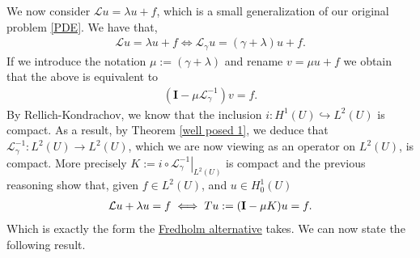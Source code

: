 \documentclass[
    a4paper,
    DIV=14,
    abstract=true,
    numbers=noenddot
]
{scrartcl}
\theoremstyle{definition}
\newcommand\restr[2]{\left.#1\right|_{#2}}
\newcommand{\Ll}{\mathcal{L}}
\begin{document}
We now consider $\Ll u =\lambda u+f$, which is a small generalization of our original problem \eqref{PDE}. We have that,
\begin{align*}
	\Ll u = \lambda u + f \iff  \Ll_\gamma u =(\gamma+\lambda)u +f.
\end{align*}
If we introduce the notation $\mu:=(\gamma+\lambda)$ and rename $v=\mu u +f$ we obtain that the above is equivalent to
\begin{align*}
	(\bm{I}- \mu \Ll_\gamma ^{-1}  )v =f.
\end{align*}
By Rellich-Kondrachov, we know that the inclusion $ i:H^1(U) \hookrightarrow L^2(U)$ is compact. As a result, by Theorem \ref{well posed 1}, we deduce that $\Ll_\gamma^{-1}: L^2(U) \to L^2(U)$, which we are now viewing as an operator on $L^2(U)$, is compact. More precisely $K:= i \circ \restr{\Ll_\gamma ^{-1}}{L^2(U)} $  is compact and the previous reasoning show that, given $f \in L^2(U)$, and $u \in H_0^1(U)$
\begin{align}\label{reasoning}
	\Ll u + \lambda u = f\iff Tu:=(\vb{I}-\mu K)u =f.
\end{align}
Which is exactly the form the \href{https://nowheredifferentiable.com/2023-05-30-PDE-2-Hilbert/#:~:text=Theorem%2010%20(-,Fredholm,-alternative).%20Let}{Fredholm alternative} takes. We can now state the following result.
\end{document}
